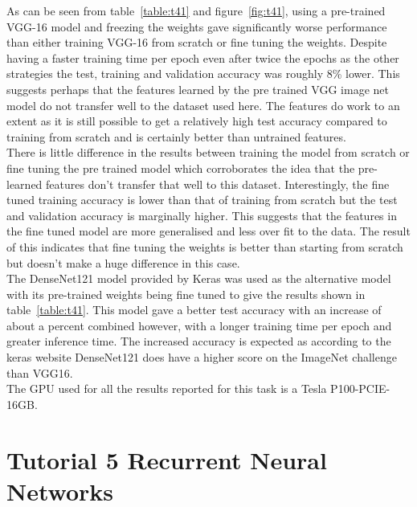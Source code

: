 \documentclass[10pt,twocolumn,letterpaper]{article}
\begin{document}
As can be seen from table~\ref{table:t41} and figure~\ref{fig:t41}, using a pre-trained VGG-16 model and freezing the weights gave significantly worse performance than either training VGG-16 from scratch or fine tuning the weights. Despite having a faster training time per epoch even after twice the epochs as the other strategies the test, training and validation accuracy was roughly 8\% lower. This suggests perhaps that the features learned by the pre trained VGG image net model do not transfer well to the dataset used here. The features do work to an extent as it is still possible to get a relatively high test accuracy compared to training from scratch and is certainly better than untrained features. \\
There is little difference in the results between training the model from scratch or fine tuning the pre trained model which corroborates the idea that the pre-learned features don't transfer that well to this dataset. Interestingly, the fine tuned training accuracy is lower than that of training from scratch but the test and validation accuracy is marginally higher. This suggests that the features in the fine tuned model are more generalised and less over fit to the data. The result of this indicates that fine tuning the weights is better than starting from scratch but doesn't make a huge difference in this case. \\
The DenseNet121 model provided by Keras was used as the alternative model with its pre-trained weights being fine tuned to give the results shown in table~\ref{table:t41}. This model gave a better test accuracy with an increase of about a percent combined however, with a longer training time per epoch and greater inference time. The increased accuracy is expected as according to the keras website\cite{pretrained} DenseNet121 does have a higher score on the ImageNet challenge than VGG16. 
\\ The GPU used for all the results reported for this task is a Tesla P100-PCIE-16GB.

\section{Tutorial 5 Recurrent Neural Networks}
\end{document}
